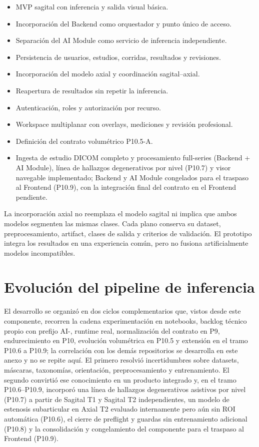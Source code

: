 \begin{itemize}
  \item MVP sagital con inferencia y salida visual básica.
  \item Incorporación del Backend como orquestador y punto único de acceso.
  \item Separación del AI Module como servicio de inferencia independiente.
  \item Persistencia de usuarios, estudios, corridas, resultados y revisiones.
  \item Incorporación del modelo axial y coordinación sagital–axial.
  \item Reapertura de resultados sin repetir la inferencia.
  \item Autenticación, roles y autorización por recurso.
  \item Workspace multiplanar con overlays, mediciones y revisión profesional.
  \item Definición del contrato volumétrico P10.5-A.
  \item Ingesta de estudio DICOM completo y procesamiento full-series (Backend + AI Module), línea de hallazgos degenerativos por nivel (P10.7) y visor navegable implementado; Backend y AI Module congelados para el traspaso al Frontend (P10.9), con la integración final del contrato en el Frontend pendiente.
\end{itemize}

La incorporación axial no reemplaza el modelo sagital ni implica que ambos modelos segmenten las mismas clases. Cada plano conserva su dataset, preprocesamiento, artifact, clases de salida y criterios de validación. El prototipo integra los resultados en una experiencia común, pero no fusiona artificialmente modelos incompatibles.

\section{Evolución del pipeline de inferencia}
\label{anexo:f-evolucion-pipeline-inferencia}

El desarrollo se organizó en dos ciclos complementarios que, vistos desde este componente, recorren la cadena experimentación en notebooks, backlog técnico propio con prefijo AI-, runtime real, normalización del contrato en P9, endurecimiento en P10, evolución volumétrica en P10.5 y extensión en el tramo P10.6 a P10.9; la correlación con los demás repositorios se desarrolla en este anexo y no se repite aquí. El primero resolvió incertidumbres sobre datasets, máscaras, taxonomías, orientación, preprocesamiento y entrenamiento. El segundo convirtió ese conocimiento en un producto integrado y, en el tramo P10.6–P10.9, incorporó una línea de hallazgos degenerativos asistivos por nivel (P10.7) a partir de Sagital T1 y Sagital T2 independientes, un modelo de estenosis subarticular en Axial T2 evaluado internamente pero aún sin ROI automática (P10.6), el cierre de preflight y guardas sin entrenamiento adicional (P10.8) y la consolidación y congelamiento del componente para el traspaso al Frontend (P10.9).

